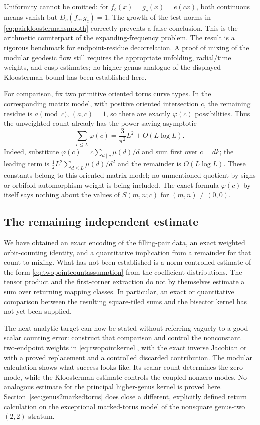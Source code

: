 \documentclass[11pt,a4paper]{article}
\numberwithin{equation}{section}
\theoremstyle{definition}
\theoremstyle{remark}
\begin{document}
Uniformity cannot be omitted: for $f_c(x)=g_c(x)=e(cx)$, both continuous
means vanish but $D_c(f_c,g_c)=1$.  The growth of the test norms in
\eqref{eq:pairkloostermansmooth} correctly prevents a false conclusion.
This is the arithmetic counterpart of the expanding-frequency problem.
The result is a rigorous benchmark for endpoint-residue decorrelation.  A
proof of mixing of the modular geodesic flow still requires the appropriate
unfolding, radial/time weights, and cusp estimates; no higher-genus analogue
of the displayed Kloosterman bound has been established here.

For comparison, fix two primitive oriented torus curve types.
In the corresponding matrix model, with positive oriented intersection
$c$, the remaining residue is $a\pmod c$, $(a,c)=1$, so there are exactly
$\varphi(c)$ possibilities.  Thus the unweighted count already has the
power-saving asymptotic
\[
 \sum_{c\leq L}\varphi(c)
   =\frac{3}{\pi^2}L^2+O(L\log L).
\]
Indeed, substitute $\varphi(c)=c\sum_{d\mid c}\mu(d)/d$ and sum first over
$c=dk$; the leading term is
$\tfrac12L^2\sum_{d\leq L}\mu(d)/d^2$
and the remainder is $O(L\log L)$.
These constants belong to this oriented matrix model; no unmentioned
quotient by signs or orbifold automorphism weight is being included.
The exact formula $\varphi(c)$ by itself says nothing about the values of
$S(m,n;c)$ for $(m,n)\ne(0,0)$.


\subsection*{The remaining independent estimate}

We have obtained an exact encoding of the filling-pair data, an exact
weighted orbit-counting identity, and a quantitative implication from
a remainder for that count to mixing.  What has not been established
is a norm-controlled estimate of the form
\eqref{eq:twopointcountassumption} from the coefficient distributions.
The tensor product and the first-corner extraction do not by themselves
estimate a sum over returning mapping classes.
In particular, an exact or quantitative comparison between the resulting
square-tiled sums and the bisector kernel has not yet been supplied.

The next analytic target can now be stated without referring vaguely
to a good scalar counting error: construct that comparison and control
the nonconstant two-endpoint weights in \eqref{eq:twopointkernel}, with the exact inverse Jacobian
or with a proved replacement and a controlled discarded contribution.
The modular calculation shows what success looks like.  Its scalar
count determines the zero mode, while the Kloosterman estimate controls
the coupled nonzero modes. No analogous estimate for the principal
higher-genus kernel is proved here. Section~\ref{sec:genus2markedtorus}
does close a different, explicitly defined return calculation on the
exceptional marked-torus model of the nonsquare genus-two $(2,2)$ stratum.
\end{document}
